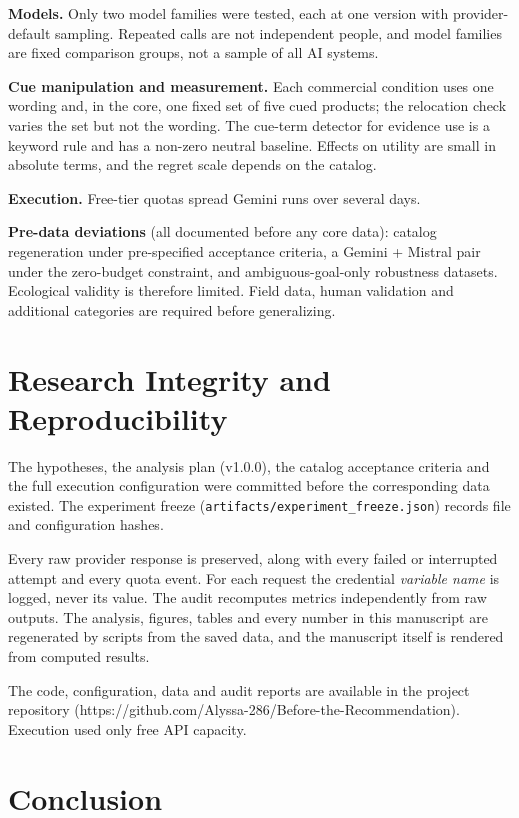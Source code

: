 \documentclass[conference]{IEEEtran}
\begin{document}
\textbf{Models.} Only two model families were tested, each at one version with provider-default sampling. Repeated calls are not independent people, and model families are fixed comparison groups, not a sample of all AI systems.

\textbf{Cue manipulation and measurement.} Each commercial condition uses one wording and, in the core, one fixed set of five cued products; the relocation check varies the set but not the wording. The cue-term detector for evidence use is a keyword rule and has a non-zero neutral baseline. Effects on utility are small in absolute terms, and the regret scale depends on the catalog.

\textbf{Execution.} Free-tier quotas spread Gemini runs over several days.

\textbf{Pre-data deviations} (all documented before any core data): catalog regeneration under pre-specified acceptance criteria, a Gemini + Mistral pair under the zero-budget constraint, and ambiguous-goal-only robustness datasets. Ecological validity is therefore limited. Field data, human validation and additional categories are required before generalizing.

\section{Research Integrity and Reproducibility}

The hypotheses, the analysis plan (v1.0.0), the catalog acceptance criteria and the full execution configuration were committed before the corresponding data existed. The experiment freeze (\texttt{artifacts/experiment\_freeze.json}) records file and configuration hashes.

Every raw provider response is preserved, along with every failed or interrupted attempt and every quota event. For each request the credential \emph{variable name} is logged, never its value. The audit recomputes metrics independently from raw outputs. The analysis, figures, tables and every number in this manuscript are regenerated by scripts from the saved data, and the manuscript itself is rendered from computed results.

The code, configuration, data and audit reports are available in the project repository (https://github.com/Alyssa-286/Before-the-Recommendation). Execution used only free API capacity.

\section{Conclusion}
\end{document}
